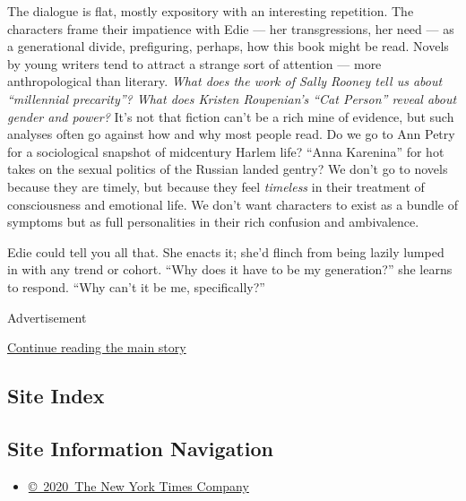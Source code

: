 The dialogue is flat, mostly expository with an interesting repetition.
The characters frame their impatience with Edie --- her transgressions,
her need --- as a generational divide, prefiguring, perhaps, how this
book might be read. Novels by young writers tend to attract a strange
sort of attention --- more anthropological than literary. \emph{What
does the work of Sally Rooney tell us about ``millennial precarity''?
What does Kristen Roupenian's ``Cat Person'' reveal about gender and
power?} It's not that fiction can't be a rich mine of evidence, but such
analyses often go against how and why most people read. Do we go to Ann
Petry for a sociological snapshot of midcentury Harlem life? ``Anna
Karenina'' for hot takes on the sexual politics of the Russian landed
gentry? We don't go to novels because they are timely, but because they
feel \emph{timeless} in their treatment of consciousness and emotional
life. We don't want characters to exist as a bundle of symptoms but as
full personalities in their rich confusion and ambivalence.

Edie could tell you all that. She enacts it; she'd flinch from being
lazily lumped in with any trend or cohort. ``Why does it have to be my
generation?'' she learns to respond. ``Why can't it be me,
specifically?''

Advertisement

\protect\hyperlink{after-bottom}{Continue reading the main story}

\hypertarget{site-index}{%
\subsection{Site Index}\label{site-index}}

\hypertarget{site-information-navigation}{%
\subsection{Site Information
Navigation}\label{site-information-navigation}}

\begin{itemize}
\tightlist
\item
  \href{https://help.nytimes.com/hc/en-us/articles/115014792127-Copyright-notice}{©~2020~The
  New York Times Company}
\end{itemize}

